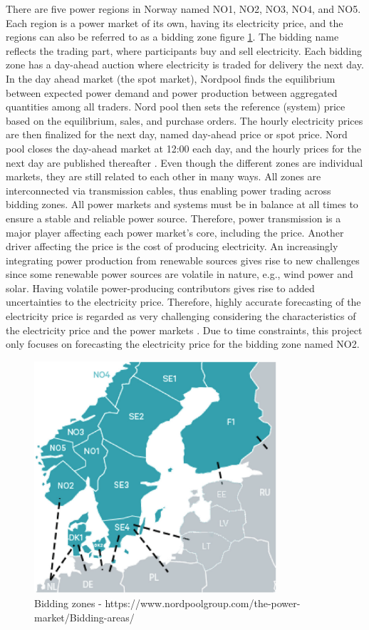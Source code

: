 \documentclass
[twocolumn,
secnumarabic,
nobibnotes,
aps,
prl,
reprint,
groupedaddress,
amsmath,
amssymb,
]{revtex4-2}
\begin{document}
There are five power regions in Norway named NO1, NO2, NO3, NO4, and NO5. Each region is a power market of its own, having its electricity price, and the regions can also be referred to as a bidding zone figure \ref{fig:biddin_zones}. The bidding name reflects the trading part, where participants buy and sell electricity. Each bidding zone has a day-ahead auction where electricity is traded for delivery the next day. In the day ahead market (the spot market), Nordpool finds the equilibrium between expected power demand and power production between aggregated quantities among all traders. Nord pool then sets the reference (system) price based on the equilibrium, sales, and purchase orders. The hourly electricity prices are then finalized for the next day, named day-ahead price or spot price. Nord pool closes the day-ahead market at 12:00 each day, and the hourly prices for the next day are published thereafter \cite{nordpool}. Even though the different zones are individual markets, they are still related to each other in many ways. All zones are interconnected via transmission cables, thus enabling power trading across bidding zones. All power markets and systems must be in balance at all times to ensure a stable and reliable power source. Therefore, power transmission is a major player affecting each power market's core, including the price. Another driver affecting the price is the cost of producing electricity. An increasingly integrating power production from renewable sources gives rise to new challenges since some renewable power sources are volatile in nature, e.g., wind power and solar. Having volatile power-producing contributors gives rise to added uncertainties to the electricity price. Therefore, highly accurate forecasting of the electricity price is regarded as very challenging considering the characteristics of the electricity price and the power markets \cite{li_day-ahead_2021, nogales_forecasting_2002,bunn_forecasting_2000}. Due to time constraints, this project only focuses on forecasting the electricity price for the bidding zone named NO2. 

\begin{figure}[t]
  \centering
  \includegraphics[width=90mm,scale=1.0]{figures/bidding_zones.png}
  \caption{Bidding zones - https://www.nordpoolgroup.com/the-power-market/Bidding-areas/}
  \label{fig:biddin_zones}
\end{figure}
\end{document}
